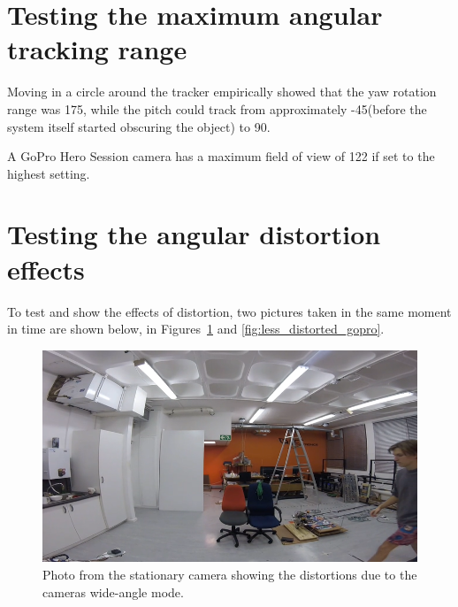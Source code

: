 \section{Testing the maximum angular tracking range}
Moving in a circle around the tracker empirically showed that the yaw rotation range was 175\textdegree, while the pitch could track from approximately -45\textdegree (before the system itself started obscuring the object) to 90\textdegree.

A GoPro Hero Session camera has a maximum field of view of 122\textdegree{} if set to the highest setting.


\section{Testing the angular distortion effects}
To test and show the effects of distortion, two pictures taken in the same moment in time are shown below, in Figures~\ref{fig:distorted_gopro} and \ref{fig:less_distorted_gopro}.

\begin{figure}[h!]
  \centering
  \includegraphics[width=\textwidth]{results/distorted_gopro}
  \caption{\label{fig:distorted_gopro}Photo from the stationary camera showing the distortions due to the cameras wide-angle mode.}
\end{figure}

